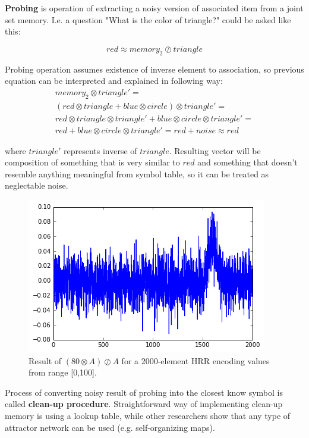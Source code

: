 \documentclass[conference]{IEEEtran}
\begin{document}
	\textbf{Probing} is operation of extracting a noisy version of associated item from a joint set memory.
I.e. a question "What is the color of triangle?" could be asked like this:
	
	\begin{equation}
	red \approx memory_2 \oslash triangle
	\end{equation}
	
	Probing operation assumes existence of inverse element to association, so previous equation can be interpreted and explained in following way:
	\begin{multline}
	memory_2 \otimes triangle'=\\
	(red \otimes triangle + blue \otimes circle) \otimes triangle'=\\
	red \otimes triangle  \otimes triangle' + blue \otimes circle \otimes triangle' =\\
	red + blue \otimes circle \otimes triangle'  = red + noise
	\approx red
	\end{multline}
	
	where $triangle'$ represents inverse of $triangle$.
Resulting vector will be composition of something that is very similar to $red$ and something that doesn't resemble anything meaningful from symbol table, so it can be treated as neglectable noise.
	
	\begin{figure}
		\center
		\includegraphics[width=0.9\columnwidth]{img/scalar-probe.png}
		\caption{Result of $(80 \otimes A) \oslash A$ for a 2000-element HRR encoding values from range [0,100].}
	\end{figure}
	
	Process of converting noisy result of probing into the closest know symbol is called \textbf{clean-up procedure}.
Straightforward way of implementing clean-up memory is using a lookup table, while other researchers show that any type of attractor network can be used (e.g. self-organizing maps).
	
\end{document}
